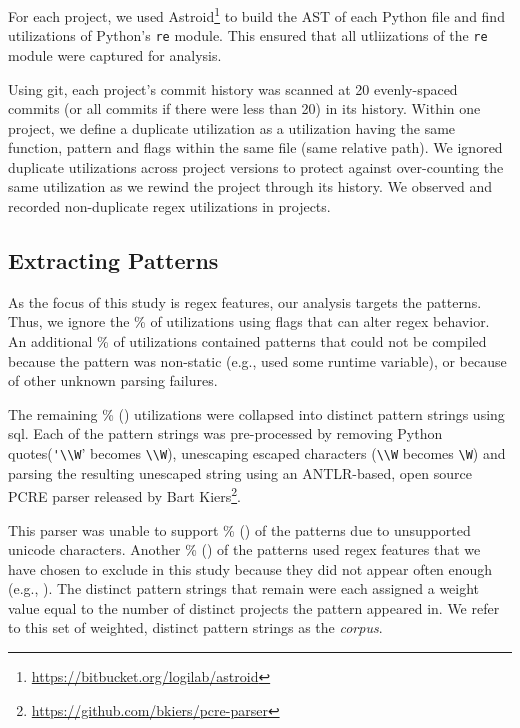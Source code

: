 For each project, we used Astroid\footnote{\url{https://bitbucket.org/logilab/astroid}} to build the AST of each Python file and find utilizations of Python's {\tt re} module. This ensured that all utliizations of the {\tt re} module were captured for analysis.

Using git, each project's commit history was scanned at 20 evenly-spaced commits (or all commits if there were less than 20) in its history. 
Within one project, we define a duplicate utilization as a utilization having the same function, pattern and flags within the same file (same relative path).  We ignored duplicate utilizations across project versions to protect against over-counting the same utilization as we rewind the project through its history.  We observed and recorded  non-duplicate regex utilizations in  projects.

\subsection{Extracting Patterns}
As the focus of this study is regex features, our analysis targets the patterns. Thus,  we ignore the \%  of utilizations using flags that can alter regex behavior.  An additional \% of utilizations contained patterns that could not be compiled because the pattern was non-static (e.g., used some runtime variable), or because of other unknown parsing failures.

The remaining \% () utilizations were collapsed into  distinct pattern strings using sql.  Each of the pattern strings was pre-processed by removing Python quotes(\verb!'\\W!' becomes \verb!\\W!), unescaping escaped characters (\verb!\\W! becomes \verb!\W!) and parsing the resulting unescaped string using an ANTLR-based, open source PCRE parser released by Bart Kiers\footnote{\url{https://github.com/bkiers/pcre-parser}}.

This parser was unable to support \% () of the patterns due to unsupported unicode characters.  Another \% () of the patterns used regex features that we have chosen to exclude in this study because they did not appear often enough (e.g., ).  The  distinct pattern strings that remain were each assigned a weight value equal to the number of distinct projects the pattern appeared in.  We  refer to this set of weighted, distinct pattern strings as the \emph{corpus}.

